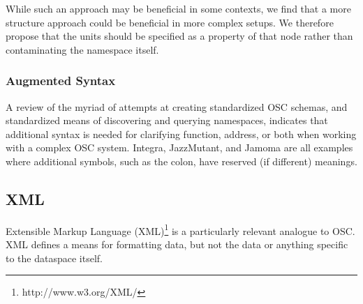 \documentclass{NIME-alternate}
\begin{document}
While such an approach may be beneficial in some contexts, we find that a more structure approach could be beneficial in more complex setups. We therefore propose that the units should be specified as a property of that node rather than contaminating the namespace itself.

\subsubsection{Augmented Syntax}

A review of the myriad of attempts at creating standardized OSC schemas, and standardized means of discovering and querying namespaces, indicates that additional syntax is needed for clarifying function, address, or both when working with a complex OSC system.  Integra, JazzMutant, and Jamoma are all examples where additional symbols, such as the colon, have reserved (if different) meanings.

%
%
%



\subsection{XML}
\label{sub:xml}

Extensible Markup Language (XML)\footnote{http://www.w3.org/XML/} is a particularly relevant analogue to OSC.  XML defines a means for formatting data, but not the data or anything specific to the dataspace itself.
\end{document}
